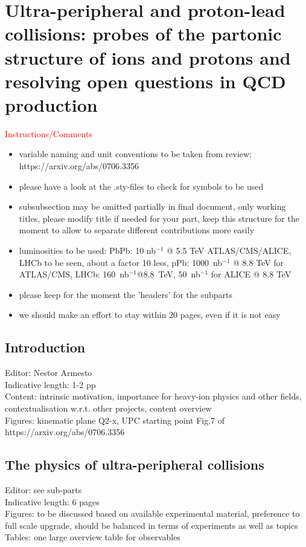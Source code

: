 \documentclass[../report.tex]{subfiles}
\begin{document}
\section{Ultra-peripheral and proton-lead collisions: probes of the partonic structure of ions and protons and resolving open questions in QCD production}

\textcolor{red}{Instructions/Comments}
\begin{itemize}
\item variable naming and unit conventions to be taken from review: https://arxiv.org/abs/0706.3356
\item please have a look at the .sty-files to check for symbols to be used
\item subsubsection may be omitted partially in final document, only working titles, please modify title if needed for your part, keep this structure for the moment to allow to separate different contributions more easily
\item luminosities to be used: PbPb: 10 nb$^{-1}$ @ 5.5 TeV ATLAS/CMS/ALICE, LHCb to be seen, about a factor 10 less, 
pPb: 1000~nb$^{-1}$ @ 8.8 TeV for ATLAS/CMS, LHCb: 160~nb$^{-1}$@8.8~TeV, 50~nb$^{-1}$ for ALICE @ 8.8 TeV 
\item please keep for the moment the 'headers' for the subparts
\item we should make an effort to stay within 20 pages, even if it is not easy
\end{itemize}

\subsection{Introduction}
Editor: Nestor Armesto \\
Indicative length: 1-2 pp \\
Content: intrinsic motivation, importance for heavy-ion physics and other fields, contextualisation w.r.t. other projects, content overview\\
Figures: kinematic plane Q2-x, UPC starting point Fig.7 of https://arxiv.org/abs/0706.3356

\subsection{The physics of ultra-peripheral collisions}
Editor: see sub-parts\\
Indicative length: 6 pages\\
Figures: to be discussed based on available experimental material, preference to full scale upgrade, should be balanced in terms of experiments as well as topics\\
Tables: one large overview table for observables
\end{document}
